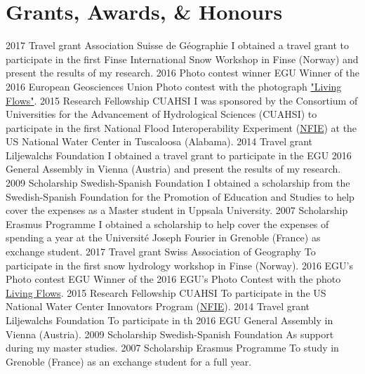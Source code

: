   \section{Grants, Awards, \& Honours}
    \ifacademic
      \position
        {2017}
        {Travel grant}
        {Association Suisse de Géographie}
        {I obtained a travel grant to participate in the first Finse International Snow Workshop in Finse (Norway) and present the results of my research.}
      \position
        {2016}
        {Photo contest winner}
        {EGU}
        {Winner of the 2016 European Geosciences Union Photo contest with the photograph \href{https://blogs.egu.eu/geolog/2016/08/29/imaggeo-on-mondays-living-flows/}{"Living Flows"}.}
      \position
        {2015}
        {Research Fellowship}
        {CUAHSI}
        {I was sponsored by the Consortium of Universities for the Advancement of Hydrological Sciences (CUAHSI) to participate in the first National Flood Interoperability Experiment (\href{https://www.cuahsi.org/education/summerinstitute/}{NFIE}) at the US National Water Center in Tuscaloosa (Alabama).}
      \position
        {2014}
        {Travel grant}
        {Liljewalchs Foundation}
        {I obtained a travel grant to participate in the EGU 2016 General Assembly in Vienna (Austria) and present the results of my research.}
      \position
        {2009}
        {Scholarship}
        {Swedish-Spanish Foundation}
        {I obtained a scholarship from the Swedish-Spanish Foundation for the Promotion of Education and Studies to help cover the expenses as a Master student in Uppsala University.}
      \position
        {2007}
        {Scholarship}
        {Erasmus Programme}
        {I obtained a scholarship to help cover the expenses of spending a year at the Université Joseph Fourier in Grenoble (France) as exchange student.}
    \else
      \position
        {2017}
        {Travel grant}
        {Swiss Association of Geography}
        {To participate in the first snow hydrology workshop in Finse (Norway).}
      \position
        {2016}
        {EGU's Photo contest}
        {EGU}
        {Winner of the 2016 EGU's Photo Contest with the photo \href{https://blogs.egu.eu/geolog/2016/08/29/imaggeo-on-mondays-living-flows/}{Living Flows}.}
      \position
        {2015}
        {Research Fellowship}
        {CUAHSI}
        {To participate in the US National Water Center Innovators Program (\href{https://www.cuahsi.org/education/summerinstitute/}{NFIE}).}
      \position
        {2014}
        {Travel grant}
        {Liljewalchs Foundation}
        {To participate in th 2016 EGU General Assembly in Vienna (Austria).}
      \position
        {2009}
        {Scholarship}
        {Swedish-Spanish Foundation}
        {As support during my master studies.}
      \position
        {2007}
        {Scholarship}
        {Erasmus Programme}
        {To study in Grenoble (France) as an exchange student for a full year.}
    \fi
\fi
